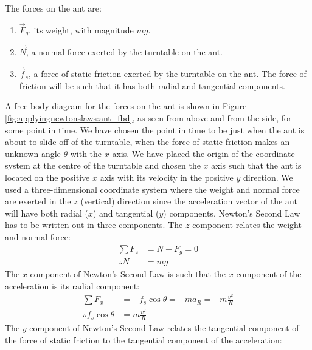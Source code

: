 \begin{example}
The forces on the ant are:
\begin{enumerate}
\item $\vec F_g$, its weight, with magnitude $mg$.
\item $\vec N$, a normal force exerted by the turntable on the ant.
\item $\vec f_s$, a force of static friction exerted by the turntable on the ant. The force of friction will be such that it has both radial and tangential components.
\end{enumerate}
A free-body diagram for the forces on the ant is shown in Figure \ref{fig:applyingnewtonslaws:ant_fbd}, as seen from above and from the side, for some point in time. We have chosen the point in time to be just when the ant is about to slide off of the turntable, when the force of static friction makes an unknown angle $\theta$ with the $x$ axis. We have placed the origin of the coordinate system at the centre of the turntable and chosen the $x$ axis such that the ant is located on the positive $x$ axis with its velocity in the positive $y$ direction. We used a three-dimensional coordinate system where the weight and normal force are exerted in the $z$ (vertical) direction since the acceleration vector of the ant will have both radial ($x$) and tangential ($y$) components.
Newton's Second Law has to be written out in three components. The $z$ component relates the weight and normal force:
\begin{align*}
\sum F_z &= N - F_g = 0\\
\therefore N&=mg
\end{align*}
The $x$ component of Newton's Second Law is such that the $x$ component of the acceleration is its radial component:
\begin{align*}
\sum F_x &= -f_s\cos\theta = -ma_R = -m\frac{v^2}{R}\\
\therefore f_s\cos\theta &= m\frac{v^2}{R}
\end{align*}
The $y$ component of Newton's Second Law relates the tangential component of the force of static friction to the tangential component of the acceleration:

\end{example}
